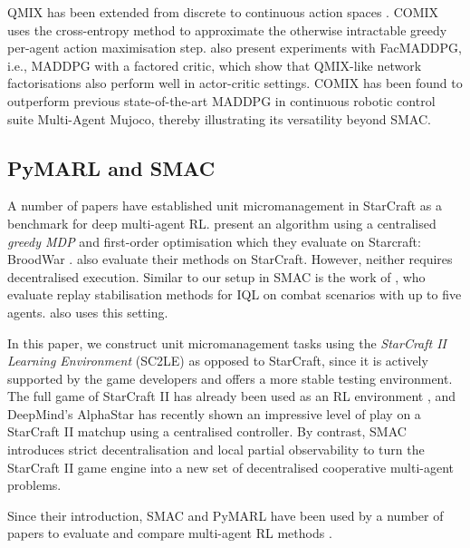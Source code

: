 \documentclass[twoside,11pt]{article}
\renewcommand{\cite}{\citep}
\begin{document}
QMIX has been extended from discrete to continuous action spaces \cite[COMIX]{de_witt_deep_2020}. COMIX uses the cross-entropy method to approximate the otherwise intractable greedy per-agent action maximisation step. \citet{de_witt_deep_2020} also present experiments with FacMADDPG, i.e., MADDPG with a factored critic, which show that QMIX-like network factorisations also perform well in actor-critic settings.
COMIX has been found to outperform previous state-of-the-art MADDPG in continuous robotic control suite Multi-Agent Mujoco, thereby illustrating its versatility beyond SMAC.


\subsection{PyMARL and SMAC}
\label{sec:rw_smac}
A number of papers have established unit micromanagement in StarCraft as a benchmark for deep multi-agent RL. 
\citet{usunier_episodic_2016} present an algorithm using a centralised \textit{greedy MDP} and first-order optimisation which they evaluate on Starcraft: BroodWar \citep{synnaeve_torchcraft_2016}. \citet{peng_multiagent_2017} also evaluate their methods on StarCraft. However, neither requires decentralised execution. 
Similar to our setup in SMAC is the work of \citet{foerster_stabilising_2017}, who evaluate replay stabilisation methods for IQL on combat scenarios with up to five agents. \citet{foerster_counterfactual_2017} also uses this setting.

In this paper, we construct unit micromanagement tasks using the \textit{StarCraft II Learning Environment} (SC2LE) \citep{vinyals_starcraft_2017} as opposed to 
StarCraft, since it is actively supported by the game developers and offers a more stable testing environment. 
The full game of StarCraft II has already been used as an RL environment \cite{vinyals_starcraft_2017}, and DeepMind's AlphaStar \cite{vinyals2019grandmaster} has recently shown an impressive level of play on a StarCraft II matchup using a centralised controller. By contrast, SMAC introduces strict decentralisation and local partial observability to turn the StarCraft II game engine into a new set of decentralised cooperative multi-agent problems. 

Since their introduction, SMAC and PyMARL have been used by a number of papers to evaluate and compare multi-agent RL methods \citep{de_witt_multi-agent_2018,wang_few_2019,du_liir:_2019,wang_learning_2019,zhang2019efficient,mahajan_maven:_2019,yao_smixlambda:_2019,bohmer_deep_2019,wang_action_2019}.
\end{document}
